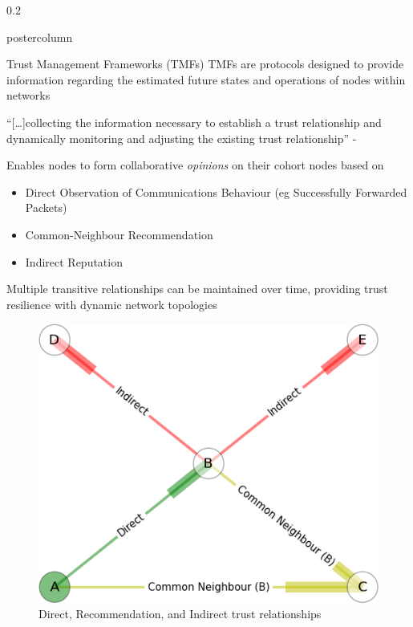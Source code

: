 \documentclass[final,hyperref={pdfpagelabels=false}]{beamer}
\def\colwidth{0.2\linewidth}
\begin{document}
\begin{frame}[fragile]
\begin{columns}[T]
    \begin{column}{\colwidth}
      \begin{beamercolorbox}[center,wd=\textwidth]{postercolumn}
        \begin{minipage}[T]{.98\textwidth} %
          \parbox[t]{\textwidth}{ %
          \begin{block}{Trust Management Frameworks (TMFs)}
            TMFs are protocols designed to provide information regarding the estimated future states and operations of nodes within networks
            \vspace{0.3\baselineskip}

            ``[\ldots]collecting the information necessary to establish a trust relationship and dynamically monitoring and adjusting the existing trust relationship'' - \cite{Li2007}
            \vspace{0.3\baselineskip}

            Enables nodes to form collaborative \emph{opinions} on their cohort nodes based on
            \begin{itemize}
              \item Direct Observation of Communications Behaviour (eg Successfully Forwarded Packets)
              \item Common-Neighbour Recommendation
              \item Indirect Reputation
            \end{itemize}
            Multiple transitive relationships can be maintained over time, providing trust resilience with dynamic network topologies
            \begin{figure}[h]
              \centering
              \includegraphics[width=0.6\linewidth]{node_relationships}
              \vspace{1ex}
              \caption{Direct, Recommendation, and Indirect trust relationships}
            \end{figure}


\end{block}}
\end{minipage}
\end{beamercolorbox}
\end{column}
\end{columns}
\end{frame}
\end{document}
